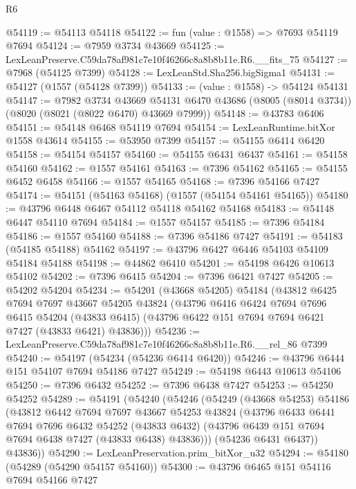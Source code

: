 \begin{lexlean}{R6}
\begin{coremodule}
@54119 := @54113 @54118
@54122 := fun (value : @1558) => @7693 @54119 @7694
@54124 := @7959 @3734 @43669
@54125 := LexLeanPreserve.C59da78af981c7e10f46266c8a8b8b11e.R6.__fits_75
@54127 := @7968 (@54125 @7399)
@54128 := LexLeanStd.Sha256.bigSigma1
@54131 := @54127 (@1557 (@54128 @7399))
@54133 := (value : @1558) -> @54124 @54131
@54147 := @7982
    @3734
    @43669
    @54131
    @6470
    @43686
    (@8005 (@8014 @3734))
    (@8020 (@8021 (@8022 @6470) @43669 @7999))
@54148 := @43783 @6406
@54151 := @54148 @6468 @54119 @7694
@54154 := LexLeanRuntime.bitXor @1558 @43614
@54155 := @53950 @7399
@54157 := @54155 @6414 @6420
@54158 := @54154 @54157
@54160 := @54155 @6431 @6437
@54161 := @54158 @54160
@54162 := @1557 @54161
@54163 := @7396 @54162
@54165 := @54155 @6452 @6458
@54166 := @1557 @54165
@54168 := @7396 @54166 @7427
@54174 := @54151 (@54163 @54168) (@1557 (@54154 @54161 @54165))
@54180 := @43796 @6448 @6467 @54112 @54118 @54162 @54168
@54183 := @54148 @6447 @54110 @7694
@54184 := @1557 @54157
@54185 := @7396 @54184
@54186 := @1557 @54160
@54188 := @7396 @54186 @7427
@54191 := @54183 (@54185 @54188) @54162
@54197 := @43796 @6427 @6446 @54103 @54109 @54184 @54188
@54198 := @44862 @6410
@54201 := @54198 @6426 @10613 @54102
@54202 := @7396 @6415
@54204 := @7396 @6421 @7427
@54205 := @54202 @54204
@54234 := @54201
    (@43668 @54205)
    @54184
    (@43812
      @6425
      @7694
      @7697
      @43667
      @54205
      @43824
      (@43796
        @6416
        @6424
        @7694
        @7696
        @6415
        @54204
        (@43833 @6415)
        (@43796 @6422 @151 @7694 @7694 @6421 @7427 (@43833 @6421) @43836)))
@54236 := LexLeanPreserve.C59da78af981c7e10f46266c8a8b8b11e.R6.__rel_86 @7399
@54240 := @54197 (@54234 (@54236 @6414 @6420))
@54246 := @43796 @6444 @151 @54107 @7694 @54186 @7427
@54249 := @54198 @6443 @10613 @54106
@54250 := @7396 @6432
@54252 := @7396 @6438 @7427
@54253 := @54250 @54252
@54289 := @54191
    (@54240
      (@54246
        (@54249
          (@43668 @54253)
          @54186
          (@43812
            @6442
            @7694
            @7697
            @43667
            @54253
            @43824
            (@43796
              @6433
              @6441
              @7694
              @7696
              @6432
              @54252
              (@43833 @6432)
              (@43796 @6439 @151 @7694 @7694 @6438 @7427 (@43833 @6438) @43836)))
          (@54236 @6431 @6437))
        @43836))
@54290 := LexLeanPreservation.prim_bitXor_u32
@54294 := @54180 (@54289 (@54290 @54157 @54160))
@54300 := @43796 @6465 @151 @54116 @7694 @54166 @7427

\end{coremodule}
\end{lexlean}

